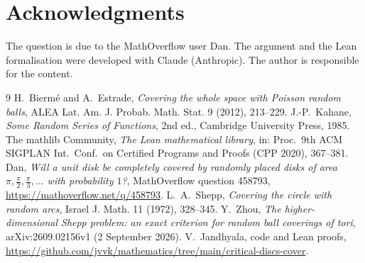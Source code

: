 \documentclass[11pt]{amsart}
\theoremstyle{remark}
\begin{document}
\section*{Acknowledgments}

The question is due to the MathOverflow user Dan. The argument and the Lean formalisation were developed with Claude (Anthropic). The author is responsible for the content.

\begin{thebibliography}{9}
 H.~Biermé and A.~Estrade, \emph{Covering the whole space with Poisson random balls}, ALEA Lat. Am. J. Probab. Math. Stat. 9 (2012), 213--229.
 J.-P.~Kahane, \emph{Some Random Series of Functions}, 2nd ed., Cambridge University Press, 1985.
 The mathlib Community, \emph{The Lean mathematical library}, in: Proc.\ 9th ACM SIGPLAN Int.\ Conf.\ on Certified Programs and Proofs (CPP 2020), 367--381.
 Dan, \emph{Will a unit disk be completely covered by randomly placed disks of area $\pi,\frac{\pi}{2},\frac{\pi}{3},\dots$ with probability $1$?}, MathOverflow question 458793, \url{https://mathoverflow.net/q/458793}.
 L.~A.~Shepp, \emph{Covering the circle with random arcs}, Israel J. Math. 11 (1972), 328--345.
 Y.~Zhou, \emph{The higher-dimensional Shepp problem: an exact criterion for random ball coverings of tori}, arXiv:2609.02156v1 (2 September 2026).
 V.~Jandhyala, code and Lean proofs, \url{https://github.com/jvvk/mathematics/tree/main/critical-discs-cover}.
\end{thebibliography}
\end{document}
